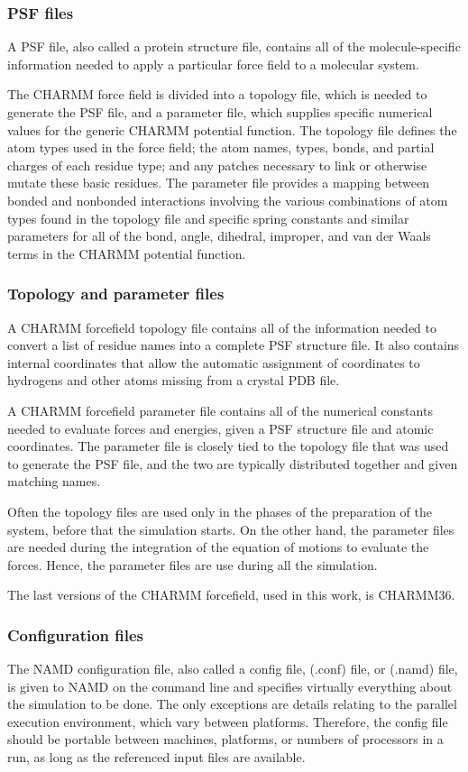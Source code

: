 \subsubsection{PSF files}
A PSF file, also called a protein structure file, contains all of the molecule-specific information needed to apply a particular force field to a molecular system. 

The CHARMM force field is divided into a topology file, which is needed to generate the PSF file, and a parameter file, which supplies specific numerical values for the generic CHARMM potential function. The topology file defines the atom types used in the force field; the atom names, types, bonds, and partial charges of each residue type; and any patches necessary to link or otherwise mutate these basic residues. The parameter file provides a mapping between bonded and nonbonded interactions involving the various combinations of atom types found in the topology file and specific spring constants and similar parameters for all of the bond, angle, dihedral, improper, and van der Waals terms in the CHARMM potential function.

\subsubsection{Topology and parameter files}
A CHARMM forcefield topology file contains all of the information needed to convert a list of residue names into a complete PSF structure file. It also contains internal coordinates that allow the automatic assignment of coordinates to hydrogens and other atoms missing from a crystal PDB file.

A CHARMM forcefield parameter file contains all of the numerical constants needed to evaluate forces and energies, given a PSF structure file and atomic coordinates. The parameter file is closely tied to the topology file that was used to generate the PSF file, and the two are typically distributed together and given matching names.

Often the topology files are used only in the phases of the preparation of the system, before that the simulation starts. On the other hand, the parameter files are needed during the integration of the equation of motions to evaluate the forces. Hence, the parameter files are use during all the simulation.

The last versions of the CHARMM forcefield, used in this work, is CHARMM36.

\subsubsection{Configuration files}
The NAMD configuration file, also called a config file, (.conf) file, or (.namd) file, is given to NAMD on the command line and specifies virtually everything about the simulation to be done. The only exceptions are details relating to the parallel execution environment, which vary between platforms. Therefore, the config file should be portable between machines, platforms, or numbers of processors in a run, as long as the referenced input files are available.



